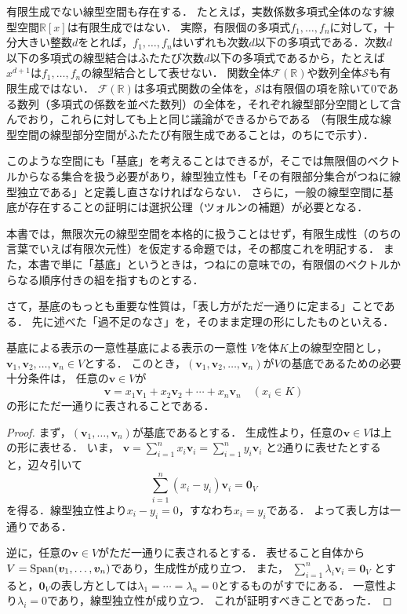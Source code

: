 \begin{mycolumn}
  有限生成でない線型空間も存在する．
  たとえば，実数係数多項式全体のなす線型空間$\mathbb{R}[x]$は有限生成ではない．
  実際，有限個の多項式$f_1, \dots, f_n$に対して，十分大きい整数$d$をとれば，$f_1, \dots, f_n$はいずれも次数$d$以下の多項式である．次数$d$以下の多項式の線型結合はふたたび次数$d$以下の多項式であるから，たとえば$x^{d+1}$は$f_1, \dots, f_n$の線型結合として表せない．
  関数全体$\mathcal{F}(\mathbb{R})$や数列全体$\mathcal{S}$も有限生成ではない．
  $\mathcal{F}(\mathbb{R})$は多項式関数の全体を，$\mathcal{S}$は有限個の項を除いて$0$である数列（多項式の係数を並べた数列）の全体を，それぞれ線型部分空間として含んでおり，これらに対しても上と同じ議論ができるからである
  （有限生成な線型空間の線型部分空間がふたたび有限生成であることは，のちにで示す）．

  このような空間にも「基底」を考えることはできるが，そこでは無限個のベクトルからなる集合を扱う必要があり，線型独立性も「その有限部分集合がつねに線型独立である」と定義し直さなければならない．
  さらに，一般の線型空間に基底が存在することの証明には選択公理（ツォルンの補題）が必要となる．

  本書では，無限次元の線型空間を本格的に扱うことはせず，有限生成性（のちの言葉でいえば有限次元性）を仮定する命題では，その都度これを明記する．
  また，本書で単に「基底」というときは，つねにの意味での，有限個のベクトルからなる順序付きの組を指すものとする．
\end{mycolumn}

さて，基底のもっとも重要な性質は，「表し方がただ一通りに定まる」ことである．
先に述べた「過不足のなさ」を，そのまま定理の形にしたものといえる．

\begin{theorem}{基底による表示の一意性}{基底による表示の一意性}
  $V$を体$K$上の線型空間とし，$\bm{v}_1, \bm{v}_2, \dots, \bm{v}_n \in V$とする．
  このとき，$(\bm{v}_1, \bm{v}_2, \dots, \bm{v}_n)$が$V$の基底であるための必要十分条件は，
  任意の$\bm{v} \in V$が
  \[
    \bm{v} = x_1 \bm{v}_1 + x_2 \bm{v}_2 + \cdots + x_n \bm{v}_n
    \quad (x_i \in K)
  \]
  の形にただ一通りに表されることである．
\end{theorem}

\begin{tleftbar}
\begin{proof}
  まず，$(\bm{v}_1, \dots, \bm{v}_n)$が基底であるとする．
  生成性より，任意の$\bm{v} \in V$は上の形に表せる．
  いま，
  $\bm{v} = \sum_{i=1}^{n} x_i \bm{v}_i = \sum_{i=1}^{n} y_i \bm{v}_i$
  と$2$通りに表せたとすると，辺々引いて
  \[
    \sum_{i=1}^{n} (x_i - y_i) \bm{v}_i = \bm{0}_V
  \]
  を得る．線型独立性より$x_i - y_i = 0$，すなわち$x_i = y_i$である．
  よって表し方は一通りである．

  逆に，任意の$\bm{v} \in V$がただ一通りに表されるとする．
  表せること自体から$V = \operatorname{Span}(\bm{v}_1, \dots, \bm{v}_n)$であり，生成性が成り立つ．
  また，
  $\sum_{i=1}^{n} \lambda_i \bm{v}_i = \bm{0}_V$
  とすると，$\bm{0}_V$の表し方としては$\lambda_1 = \cdots = \lambda_n = 0$とするものがすでにある．
  一意性より$\lambda_i = 0$であり，線型独立性が成り立つ．
  これが証明すべきことであった．
\end{proof}
\end{tleftbar}

